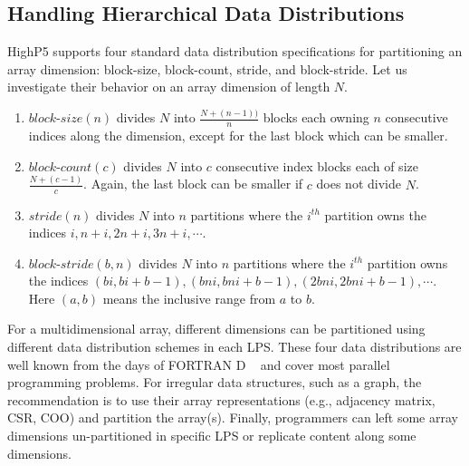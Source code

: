 \documentclass[ASNA,twocolumn]{USG} %
\begin{document}
{\subsection{Handling Hierarchical Data Distributions}
\label{subsec:data-distro}
HighP5 supports four standard data distribution specifications for partitioning an array dimension: block-size, block-count, stride, and block-stride. Let us investigate their behavior on an array dimension of length $N$.
\begin{enumerate}
	\item $block$-$size(n)$ divides $N$ into $\frac{N + (n - 1))}{n}$ blocks each owning $n$ consecutive indices along the dimension, except for the last block which can be smaller.
	\item $block$-$count(c)$ divides $N$ into $c$ consecutive index blocks each of size $\frac{N + (c - 1)}{c}$. Again, the last block can be smaller if $c$ does not divide $N$.
	\item $stride(n)$ divides $N$ into $n$ partitions where the $i^{th}$ partition owns the indices $i, n + i, 2n + i, 3n + i, \cdots$.
	\item $block$-$stride(b, n)$ divides $N$ into $n$ partitions where the $i^{th}$ partition owns the indices $(bi, bi + b - 1), (bni, bni + b - 1), (2bni, 2bni + b - 1), \cdots$. Here $(a,b)$ means the inclusive range from $a$ to $b$.
\end{enumerate}
For a multidimensional array, different dimensions can be partitioned using different data distribution schemes in each LPS. These four data distributions are well known from the days of FORTRAN D ~\citep{10.1007/BFb0038655} and cover most parallel programming problems. For irregular data structures, such as a graph, the recommendation is to use their array representations (e.g., adjacency matrix, CSR, COO) and partition the array(s). Finally, programmers can left some array dimensions un-partitioned in specific LPS or replicate content along some dimensions.

}
\end{document}
